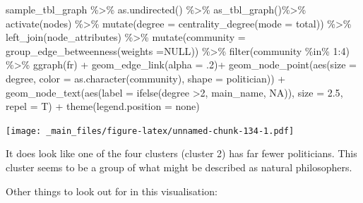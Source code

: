 \documentclass[
]{book}
\newenvironment{Shaded}{\begin{snugshade}}{\end{snugshade}}
\newcommand{\AttributeTok}[1]{\textcolor[rgb]{0.77,0.63,0.00}{#1}}
\newcommand{\ConstantTok}[1]{\textcolor[rgb]{0.00,0.00,0.00}{#1}}
\newcommand{\DecValTok}[1]{\textcolor[rgb]{0.00,0.00,0.81}{#1}}
\newcommand{\FloatTok}[1]{\textcolor[rgb]{0.00,0.00,0.81}{#1}}
\newcommand{\FunctionTok}[1]{\textcolor[rgb]{0.00,0.00,0.00}{#1}}
\newcommand{\NormalTok}[1]{#1}
\newcommand{\SpecialCharTok}[1]{\textcolor[rgb]{0.00,0.00,0.00}{#1}}
\newcommand{\StringTok}[1]{\textcolor[rgb]{0.31,0.60,0.02}{#1}}
\begin{document}
\begin{Shaded}
\begin{Highlighting}[]
\NormalTok{sample\_tbl\_graph }\SpecialCharTok{\%\textgreater{}\%} 
  \FunctionTok{as.undirected}\NormalTok{() }\SpecialCharTok{\%\textgreater{}\%} 
  \FunctionTok{as\_tbl\_graph}\NormalTok{()}\SpecialCharTok{\%\textgreater{}\%} 
  \FunctionTok{activate}\NormalTok{(nodes) }\SpecialCharTok{\%\textgreater{}\%} 
  \FunctionTok{mutate}\NormalTok{(}\AttributeTok{degree =} \FunctionTok{centrality\_degree}\NormalTok{(}\AttributeTok{mode =} \StringTok{\textquotesingle{}total\textquotesingle{}}\NormalTok{)) }\SpecialCharTok{\%\textgreater{}\%} 
  \FunctionTok{left\_join}\NormalTok{(node\_attributes) }\SpecialCharTok{\%\textgreater{}\%} 
  \FunctionTok{mutate}\NormalTok{(}\AttributeTok{community =} \FunctionTok{group\_edge\_betweenness}\NormalTok{(}\AttributeTok{weights =}\ConstantTok{NULL}\NormalTok{)) }\SpecialCharTok{\%\textgreater{}\%} 
  \FunctionTok{filter}\NormalTok{(community }\SpecialCharTok{\%in\%} \DecValTok{1}\SpecialCharTok{:}\DecValTok{4}\NormalTok{) }\SpecialCharTok{\%\textgreater{}\%} 
  \FunctionTok{ggraph}\NormalTok{(}\StringTok{\textquotesingle{}fr\textquotesingle{}}\NormalTok{) }\SpecialCharTok{+} 
  \FunctionTok{geom\_edge\_link}\NormalTok{(}\AttributeTok{alpha =}\NormalTok{ .}\DecValTok{2}\NormalTok{)}\SpecialCharTok{+} 
  \FunctionTok{geom\_node\_point}\NormalTok{(}\FunctionTok{aes}\NormalTok{(}\AttributeTok{size =}\NormalTok{ degree, }\AttributeTok{color =} \FunctionTok{as.character}\NormalTok{(community), }\AttributeTok{shape =}\NormalTok{ politician))  }\SpecialCharTok{+} 
  \FunctionTok{geom\_node\_text}\NormalTok{(}\FunctionTok{aes}\NormalTok{(}\AttributeTok{label =} \FunctionTok{ifelse}\NormalTok{(degree }\SpecialCharTok{\textgreater{}}\DecValTok{2}\NormalTok{, main\_name, }\ConstantTok{NA}\NormalTok{)), }\AttributeTok{size =} \FloatTok{2.5}\NormalTok{, }\AttributeTok{repel =}\NormalTok{ T) }\SpecialCharTok{+} 
  \FunctionTok{theme}\NormalTok{(}\AttributeTok{legend.position =} \StringTok{\textquotesingle{}none\textquotesingle{}}\NormalTok{)}
\end{Highlighting}
\end{Shaded}

\texttt{[image: \_main\_files/figure-latex/unnamed-chunk-134-1.pdf]}

It does look like one of the four clusters (cluster 2) has far fewer politicians. This cluster seems to be a group of what might be described as natural philosophers.

Other things to look out for in this visualisation:
\end{document}
